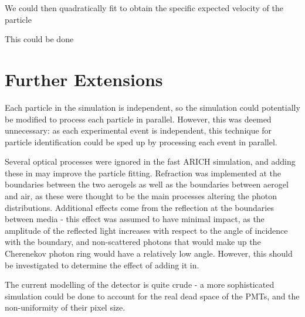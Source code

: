 We could then quadratically fit to obtain the specific expected velocity of the particle

This could be done


\section{Further Extensions}

Each particle in the simulation is independent, so the simulation could potentially be modified to process each particle in parallel. 
However, this was deemed unnecessary: as each experimental event is independent, this technique for particle identification could be sped up by processing each event in parallel.

Several optical processes were ignored in the fast ARICH simulation, and adding these in may improve the particle fitting. 
Refraction was implemented at the boundaries between the two aerogels as well as the boundaries between aerogel and air, as these were thought to be the main processes altering the photon distributions.
Additional effects come from the reflection at the boundaries between media - this effect was assumed to have minimal impact, as the amplitude of the reflected light increases with respect to the angle of incidence with the boundary, and non-scattered photons that would make up the Cherenekov photon ring would have a relatively low angle.
However, this should be investigated to determine the effect of adding it in.

The current modelling of the detector is quite crude - a more sophisticated simulation could be done to account for the real dead space of the PMTs, and the non-uniformity of their pixel size. 



\endinput 

Any text after an \endinput is ignored.
You could put scraps here or things in progress.
